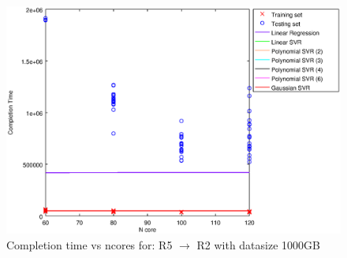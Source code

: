 
\begin {figure}[hbtp]
\centering
\includegraphics[width=\textwidth]{output/R5_R2_1000_ALL_FEATURES/plot_R5_R2_1000.eps}
\caption{Completion time vs ncores for: R5 $\rightarrow$ R2 with datasize 1000GB}
\label{fig:coreonly_linear_R5_R2_1000}
\end {figure}
